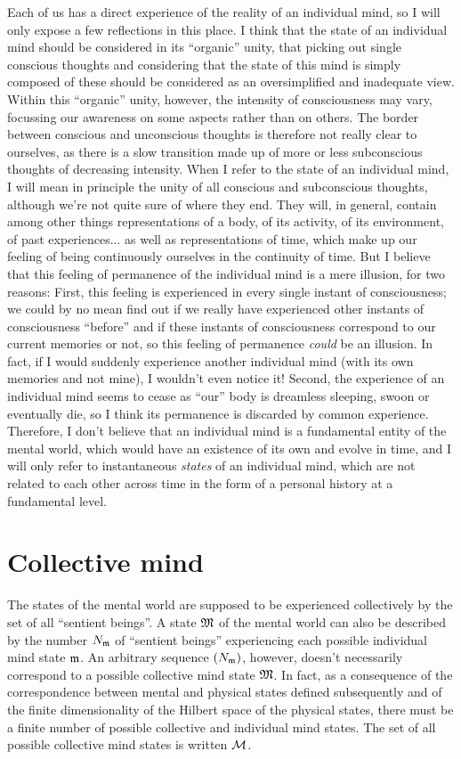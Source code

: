 \documentclass[10pt,a4paper,twoside,openany]{book}
\begin{document}
Each of us has a direct experience of the reality of an individual mind, so I will only expose a few reflections in this place. I think that the state of an individual mind should be considered in its ``organic'' unity, that picking out single conscious thoughts and considering that the state of this mind is simply composed of these should be considered as an oversimplified and inadequate view. Within this ``organic'' unity, however, the intensity of consciousness may vary, focussing our awareness on some aspects rather than on others. The border between conscious and unconscious thoughts is therefore not really clear to ourselves, as there is a slow transition made up of more or less subconscious thoughts of decreasing intensity. When I refer to the state of an individual mind, I will mean in principle the unity of all conscious and subconscious thoughts, although we're not quite sure of where they end. They will, in general, contain among other things representations of a body, of its activity, of its environment, of past experiences... as well as representations of time, which make up our feeling of being continuously ourselves in the continuity of time. But I believe that this feeling of permanence of the individual mind is a mere illusion, for two reasons: First, this feeling is experienced in every single instant of consciousness; we could by no mean find out if we really have experienced other instants of consciousness ``before'' and if these instants of consciousness correspond to our current memories or not, so this feeling of permanence \textit{could} be an illusion. In fact, if I would suddenly experience another individual mind (with its own memories and not mine), I wouldn't even notice it! Second, the experience of an individual mind seems to cease as ``our'' body is dreamless sleeping, swoon or eventually die, so I think its permanence is discarded by common experience. Therefore, I don't believe that an individual mind is a fundamental entity of the mental world, which would have an existence of its own and evolve in time, and I will only refer to instantaneous \textit{states} of an individual mind, which are not related to each other across time in the form of a personal history at a fundamental level.

\section{Collective mind}

The states of the mental world are supposed to be experienced collectively by the set of all ``sentient beings''. A state $\mathfrak{M}$ of the mental world can also be described by the number ${N}_{\mathfrak{m}}$ of ``sentient beings'' experiencing each possible individual mind state $\mathfrak{m}$. An arbitrary sequence $({N}_{\mathfrak{m}})$, however, doesn't necessarily correspond to a possible collective mind state $\mathfrak{M}$. In fact, as a consequence of the correspondence between mental and physical states defined subsequently and of the finite dimensionality of the Hilbert space of the physical states, there must be a finite number of possible collective and individual mind states. The set of all possible collective mind states is written $\mathcal M$.
\end{document}
